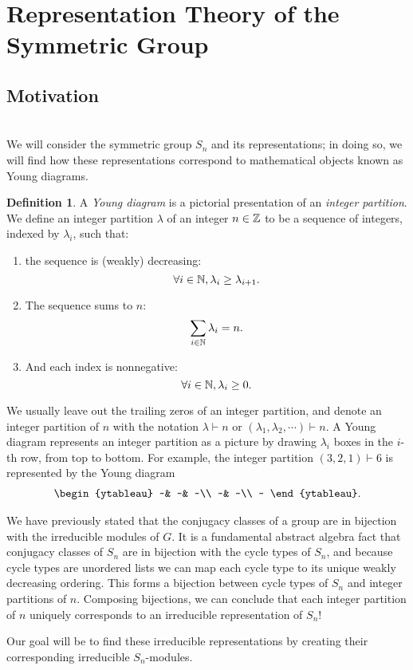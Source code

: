 \documentclass[12pt,twoside]{reedthesis}
\theoremstyle{plain}   %
\theoremstyle{definition}
\newtheorem{defn}{Definition}[section]
\theoremstyle{remark}
\numberwithin{equation}{section}
\begin{document}
  \section{Representation Theory of the Symmetric Group}
  \subsection{Motivation}\label{motivation} \hfill\\
  We will consider the symmetric group $S_n$ and its representations; in doing so, we will find how these representations correspond to mathematical objects known as Young diagrams.
  \begin{defn}
    A \emph{Young diagram} is a pictorial presentation of an \emph{integer partition}.
    We define an integer partition $\lambda$ of an integer $n \in \mathbb{Z}$ to be a sequence of integers, indexed by $\lambda_i$, such that:
    \begin{enumerate}
    \item the sequence is (weakly) decreasing:
      \[\forall i \in \mathbb{N}, \lambda_i \geq \lambda_{i+1}.\]
    \item
      The sequence sums to $n$:
      \[ \sum_{i \in \mathbb{N}} \lambda_i = n. \]
    \item
      And each index is nonnegative:
      \[\forall i \in \mathbb{N}, \lambda_i \geq 0.\]
    \end{enumerate}
    We usually leave out the trailing zeros of an integer partition, and denote an integer partition of $n$ with the notation $\lambda \vdash n$ or $(\lambda_1,\lambda_2,\cdots) \vdash n$.
    A Young diagram represents an integer partition as a picture by drawing $\lambda_i$ boxes in the $i$-th row, from top to bottom.
    For example, the integer partition $(3,2,1) \vdash 6$ is represented by the Young diagram
    \[
      \begin{array}{@{}c@{}}
      \begin{ytableau}
        ~& ~& ~\\
        ~& ~\\
        ~
      \end{ytableau}
      \end{array}
      .
    \]
  \end{defn}
  \par
  We have previously stated that the conjugacy classes of a group are in bijection with the irreducible modules of $G$. It is a fundamental abstract algebra fact that 
  conjugacy classes of $S_n$ are in bijection with the cycle types of $S_n$,
  and because cycle types are unordered lists we can map each cycle type to its unique weakly decreasing ordering.
  This forms a bijection between cycle types of $S_n$ and integer partitions of $n$.
  Composing bijections, we can conclude that each integer partition of $n$ uniquely corresponds to an irreducible representation of $S_n$! \par
  Our goal will be to find these irreducible representations by creating their corresponding irreducible $S_n$-modules.
\end{document}
